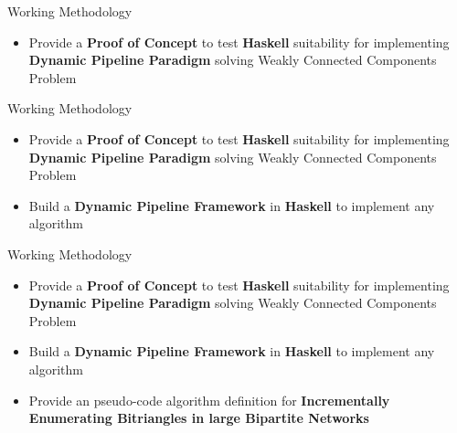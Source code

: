 
\begin{frame}[fragile]{Working Methodology}
  \begin{itemize}
    \item Provide a \textbf{Proof of Concept} to test \textbf{Haskell} suitability for implementing  \textbf{Dynamic Pipeline Paradigm} solving Weakly Connected Components Problem
  \end{itemize}   
\end{frame}

\begin{frame}[fragile]{Working Methodology}
    \begin{itemize}
      \setlength\itemsep{1.5em}
      \item {\color{light}Provide a \textbf{Proof of Concept} to test \textbf{Haskell} suitability for implementing  \textbf{Dynamic Pipeline Paradigm} solving Weakly Connected Components Problem}
      \item Build a \textbf{Dynamic Pipeline Framework} in \textbf{Haskell} to implement any algorithm 
  \end{itemize}   
\end{frame}

\begin{frame}[fragile]{Working Methodology}
    \begin{itemize}
      \setlength\itemsep{1.5em}
      \item {\color{light}Provide a \textbf{Proof of Concept} to test \textbf{Haskell} suitability for implementing  \textbf{Dynamic Pipeline Paradigm} solving Weakly Connected Components Problem}
      \item {\color{light}Build a \textbf{Dynamic Pipeline Framework} in \textbf{Haskell} to implement any algorithm }
      \item Provide an pseudo-code algorithm definition for \textbf{Incrementally Enumerating Bitriangles in large Bipartite Networks}
  \end{itemize}   
\end{frame}

